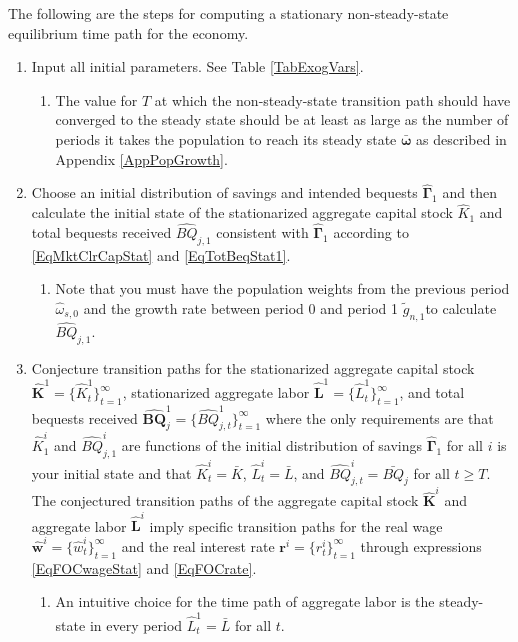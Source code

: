 \documentclass[letterpaper,12pt]{article}
\theoremstyle{definition}
\begin{document}
  The following are the steps for computing a stationary non-steady-state equilibrium time path for the economy.
  \begin{enumerate}
    \item Input all initial parameters. See Table \ref{TabExogVars}.
      \begin{enumerate}
        \item The value for $T$ at which the non-steady-state transition path should have converged to the steady state should be at least as large as the number of periods it takes the population to reach its steady state $\bm{\bar{\omega}}$ as described in Appendix \ref{AppPopGrowth}.
      \end{enumerate}

    \item Choose an initial distribution of savings and intended bequests $\bm{\hat{\Gamma}}_1$ and then calculate the initial state of the stationarized aggregate capital stock $\hat{K}_1$ and total bequests received $\hat{BQ}_{j,1}$ consistent with $\bm{\hat{\Gamma}}_1$ according to \eqref{EqMktClrCapStat} and \eqref{EqTotBeqStat1}.
      \begin{enumerate}
        \item Note that you must have the population weights from the previous period $\hat{\omega}_{s,0}$ and the growth rate between period 0 and period 1 $\tilde{g}_{n,1}$to calculate $\hat{BQ}_{j,1}$.
      \end{enumerate}
    \item Conjecture transition paths for the stationarized aggregate capital stock $\bm{\hat{K}}^1=\{\hat{K}^1_t\}_{t=1}^\infty$, stationarized aggregate labor $\bm{\hat{L}}^1=\{\hat{L}^1_t\}_{t=1}^\infty$, and total bequests received $\bm{\hat{BQ}}_j^1=\{\hat{BQ}^{1}_{j,t}\}_{t=1}^\infty$ where the only requirements are that $\hat{K}^i_1$ and $\hat{BQ}^i_{j,1}$ are functions of the initial distribution of savings $\bm{\hat{\Gamma}}_1$ for all $i$ is your initial state and that $\hat{K}^i_t=\bar{K}$, $\hat{L}^i_t=\bar{L}$, and $\hat{BQ}^i_{j,t}= \bar{BQ}_j$ for all $t\geq T$. The conjectured transition paths of the aggregate capital stock $\bm{\hat{K}}^i$ and aggregate labor $\bm{\hat{L}}^i$ imply specific transition paths for the real wage $\bm{\hat{w}}^i=\{\hat{w}^i_t\}_{t=1}^\infty$ and the real interest rate $\bm{r}^i=\{r^i_t\}_{t=1}^\infty$ through expressions \eqref{EqFOCwageStat} and \eqref{EqFOCrate}.
      \begin{enumerate}
        \item An intuitive choice for the time path of aggregate labor is the steady-state in every period $\hat{L}^1_t = \bar{L}$ for all $t$.

\end{enumerate}
\end{enumerate}
\end{document}
